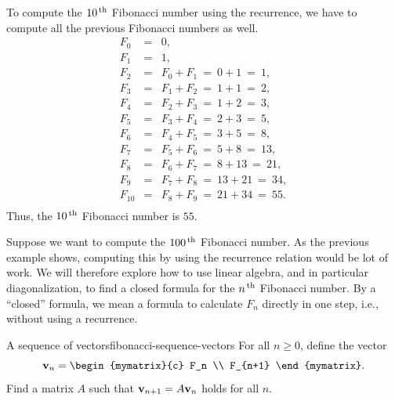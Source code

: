 \begin{solution}
  To compute the $10^{\,\rm th}$ Fibonacci number using the recurrence, we
  have to compute all the previous Fibonacci numbers as well.
  \begin{eqnarray*}
    F_0 &=& 0, \\
    F_1 &=& 1, \\
    F_2 &=& F_0 + F_1 ~=~ 0 + 1 ~=~ 1, \\
    F_3 &=& F_1 + F_2 ~=~ 1 + 1 ~=~ 2, \\
    F_4 &=& F_2 + F_3 ~=~ 1 + 2 ~=~ 3, \\
    F_5 &=& F_3 + F_4 ~=~ 2 + 3 ~=~ 5, \\
    F_6 &=& F_4 + F_5 ~=~ 3 + 5 ~=~ 8, \\
    F_7 &=& F_5 + F_6 ~=~ 5 + 8 ~=~ 13, \\
    F_8 &=& F_6 + F_7 ~=~ 8 + 13 ~=~ 21, \\
    F_9 &=& F_7 + F_8 ~=~ 13 + 21 ~=~ 34, \\
    F_{10} &=& F_8 + F_9 ~=~ 21 + 34 ~=~ 55. \\
  \end{eqnarray*}
  Thus, the $10^{\,\rm th}$ Fibonacci number is $55$.
\end{solution}

Suppose we want to compute the $100^{\,\rm th}$ Fibonacci number. As the
previous example shows, computing this by using the recurrence
relation would be lot of work. We will therefore explore how
to use linear algebra, and in particular diagonalization, to find a
closed formula for the $n^{\,\rm th}$ Fibonacci number. By a ``closed''
formula, we mean a formula to calculate $F_n$ directly in one step,
i.e., without using a recurrence.

\begin{example}{A sequence of vectors}{fibonacci-sequence-vectors}
  For all $n\geq 0$, define the vector
  \begin{equation*}
    \vect{v}_n = \begin{mymatrix}{c} F_n \\ F_{n+1} \end{mymatrix}.
  \end{equation*}
  Find a matrix $A$ such that $\mbox{\bf v}_{n+1} = A\mbox{\bf v}_n$ holds for
  all $n$.
\end{example}

